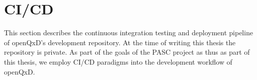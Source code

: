 \chapter{CI/CD}
\label{ch:p1:cicd}

This section describes the continuous integration testing and deployment pipeline of openQxD's development repository\cite{gitlab:openqxd-devel}. At the time of writing this thesis the repository is private. As part of the goals of the PASC project\cite{pasc:project} as thus as part of this thesis, we employ CI/CD paradigms into the development workflow of openQxD.

